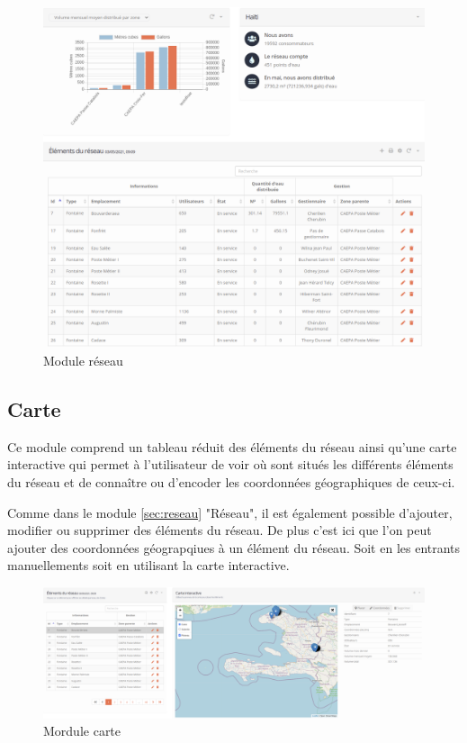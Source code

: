 \documentclass{EPL-master-thesis-covers-FR}
\begin{document}
				\begin{figure}[H]
					\centering
					\includegraphics[width=1\textwidth]{images/water_elem}
					\caption{Module réseau}
				\end{figure}
				
\newpage
				
			\subsection{Carte}
				Ce module comprend un tableau réduit des éléments du réseau ainsi qu'une carte interactive qui permet à l'utilisateur de voir où sont situés les différents éléments du réseau et de connaître ou d'encoder les coordonnées géographiques de ceux-ci. 
				
				Comme dans le module \ref{sec:reseau} "Réseau", il est également possible d'ajouter, modifier ou supprimer des éléments du réseau. De plus c'est ici que l'on peut ajouter des coordonnées géograpqiues à un élément du réseau. Soit en les entrants manuellements soit en utilisant la carte interactive.
				\begin{figure}[H]
					\centering
					\includegraphics[width=1\textwidth]{images/map}
					\caption{Mordule carte}
				\end{figure}
				
\end{document}
